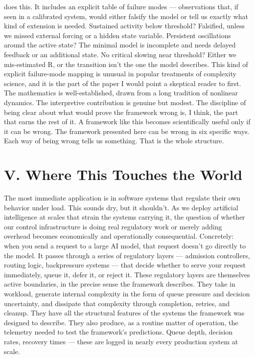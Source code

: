 \documentclass[12pt]{article}
\begin{document}
does this. It includes an explicit table of failure modes --- observations that, if seen in a calibrated system, would either falsify the model or tell us exactly what kind of extension is needed. Sustained activity below threshold? Falsified, unless we missed external forcing or a hidden state variable. Persistent oscillations around the active state? The minimal model is incomplete and needs delayed feedback or an additional state. No critical slowing near threshold? Either we mis-estimated R, or the transition isn't the one the model describes. This kind of explicit failure-mode mapping is unusual in popular treatments of complexity science, and it is the part of the paper I would point a skeptical reader to first. The mathematics is well-established, drawn from a long tradition of nonlinear dynamics. The interpretive contribution is genuine but modest. The discipline of being clear about what would prove the framework wrong is, I think, the part that earns the rest of it. A framework like this becomes scientifically useful only if it can be wrong. The framework presented here can be wrong in six specific ways. Each way of being wrong tells us something. That is the whole structure.


\section*{V. Where This Touches the World}

The most immediate application is in software systems that regulate their own behavior under load. This sounds dry, but it shouldn't. As we deploy artificial intelligence at scales that strain the systems carrying it, the question of whether our control infrastructure is doing real regulatory work or merely adding overhead becomes economically and operationally consequential. Concretely: when you send a request to a large AI model, that request doesn't go directly to the model. It passes through a series of regulatory layers --- admission controllers, routing logic, backpressure systems --- that decide whether to serve your request immediately, queue it, defer it, or reject it. These regulatory layers are themselves active boundaries, in the precise sense the framework describes. They take in workload, generate internal complexity in the form of queue pressure and decision uncertainty, and dissipate that complexity through completion, retries, and cleanup. They have all the structural features of the systems the framework was designed to describe. They also produce, as a routine matter of operation, the telemetry needed to test the framework's predictions. Queue depth, decision rates, recovery times --- these are logged in nearly every production system at scale.
\end{document}

